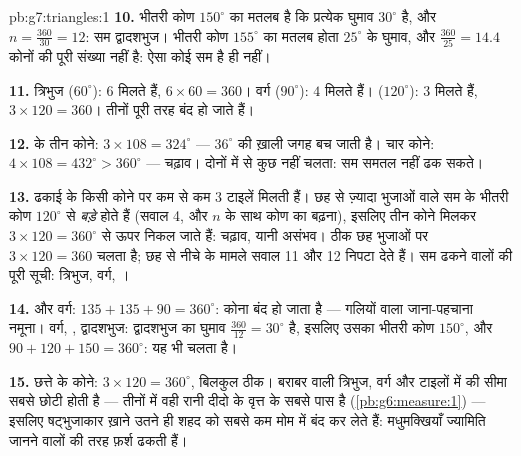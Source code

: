 \begin{solution}{pb:g7:triangles:1}
\textbf{10.} भीतरी कोण $150^\circ$ का मतलब है कि प्रत्येक घुमाव
$30^\circ$ है, और $n = \frac{360}{30} = 12$: सम द्वादशभुज।
भीतरी कोण $155^\circ$ का मतलब होता $25^\circ$ के घुमाव, और
$\frac{360}{25} = 14.4$ कोनों की पूरी संख्या नहीं है: ऐसा कोई सम
 है ही नहीं।

\textbf{11.} त्रिभुज ($60^\circ$): $6$ मिलते हैं,
$6 \times 60 = 360$। वर्ग ($90^\circ$): $4$ मिलते हैं। 
($120^\circ$): $3$ मिलते हैं, $3 \times 120 = 360$। तीनों पूरी
तरह बंद हो जाते हैं।

\textbf{12.}  के तीन कोने: $3 \times 108 = 324^\circ$ ---
$36^\circ$ की ख़ाली जगह बच जाती है। चार कोने:
$4 \times 108 = 432^\circ > 360^\circ$ --- चढ़ाव। दोनों में से
कुछ नहीं चलता: सम  समतल नहीं ढक सकते।

\textbf{13.} ढकाई के किसी कोने पर कम से कम $3$ टाइलें मिलती हैं।
छह से ज़्यादा भुजाओं वाले सम  के भीतरी कोण $120^\circ$ से
\emph{बड़े} होते हैं (सवाल 4, और $n$ के साथ कोण का बढ़ना), इसलिए
तीन कोने मिलकर $3 \times 120 = 360^\circ$ से ऊपर निकल जाते हैं:
चढ़ाव, यानी असंभव। ठीक छह भुजाओं पर $3 \times 120 = 360$ चलता है;
छह से नीचे के मामले सवाल 11 और 12 निपटा देते हैं। सम ढकने वालों
की पूरी सूची: त्रिभुज, वर्ग, ।

\textbf{14.}  और वर्ग: $135 + 135 + 90 = 360^\circ$: कोना
बंद हो जाता है --- गलियों वाला जाना-पहचाना नमूना। वर्ग, ,
द्वादशभुज: द्वादशभुज का घुमाव $\frac{360}{12} = 30^\circ$ है,
इसलिए उसका भीतरी कोण $150^\circ$, और
$90 + 120 + 150 = 360^\circ$: यह भी चलता है।

\textbf{15.} छत्ते के कोने: $3 \times 120 = 360^\circ$, बिलकुल
ठीक। बराबर  वाली त्रिभुज, वर्ग और  टाइलों में
 की सीमा सबसे छोटी होती है --- तीनों में वही रानी दीदो के
वृत्त के सबसे पास है (\cref{pb:g6:measure:1}) --- इसलिए षट्भुजाकार
ख़ाने उतने ही शहद को सबसे कम मोम में बंद कर लेते हैं: मधुमक्खियाँ
ज्यामिति जानने वालों की तरह फ़र्श ढकती हैं।

\end{solution}
